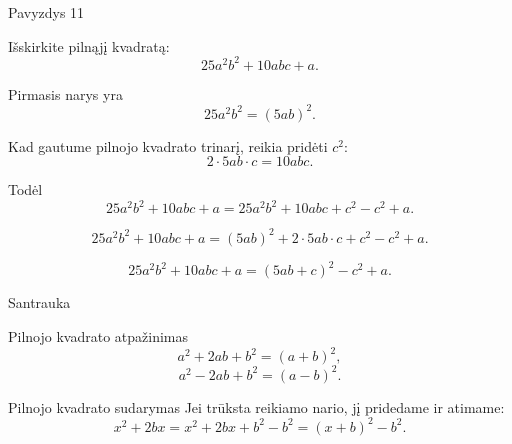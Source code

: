 \documentclass[aspectratio=169,11pt]{beamer}
\begin{document}
\begin{frame}{Pavyzdys 11}

Išskirkite pilnąjį kvadratą:
\[
25a^2b^2+10abc+a.
\]

\pause

Pirmasis narys yra
\[
25a^2b^2=(5ab)^2.
\]

\pause

Kad gautume pilnojo kvadrato trinarį, reikia pridėti $c^2$:
\[
2\cdot5ab\cdot c=10abc.
\]

\pause

Todėl
\[
25a^2b^2+10abc+a
=25a^2b^2+10abc+c^2-c^2+a.
\]

\pause

\[
25a^2b^2+10abc+a
=(5ab)^2+2\cdot5ab\cdot c+c^2-c^2+a.
\]

\pause

\[
25a^2b^2+10abc+a
=(5ab+c)^2-c^2+a.
\]

\end{frame}

\begin{frame}{Santrauka}

\begin{block}{Pilnojo kvadrato atpažinimas}
\[
a^2+2ab+b^2=(a+b)^2,
\]
\[
a^2-2ab+b^2=(a-b)^2.
\]
\end{block}

\pause

\begin{block}{Pilnojo kvadrato sudarymas}
Jei trūksta reikiamo nario, jį pridedame ir atimame:
\[
x^2+2bx
=x^2+2bx+b^2-b^2
=(x+b)^2-b^2.
\]
\end{block}

\end{frame}
\end{document}
